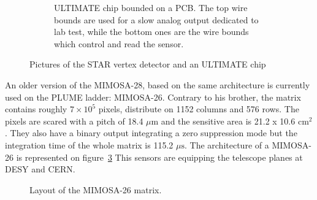 \begin{figure}[!h]
\begin{subfigure}[t]{0.3\textwidth}
        \caption{ULTIMATE chip bounded on a PCB. The top wire bounds are used for a slow analog output dedicated to lab test, while the bottom ones are the wire bounds which control and read the sensor. }
        \label{fig:ultimate}
    \end{subfigure}
    \caption{Pictures of the STAR vertex detector and an ULTIMATE chip}\label{fig:Mi28}
    \end{figure}    

An older version of the \gls{MIMOSA}-28, based on the same architecture is currently used on the \gls{PLUME} ladder: \gls{MIMOSA}-26.
    Contrary to his brother, the matrix contains roughly $7 \times 10^5$ pixels, distribute on 1152 columns and 576 rows.
    The pixels are scared with a pitch of 18.4 $\mu\text{m}$ and the sensitive area is 21.2 x 10.6 $\text{cm}^2$.
    They also have a binary output integrating a zero suppression mode but the integration time of the whole matrix is 115.2 $\mu\text{s}$.
    The architecture of a \gls{MIMOSA}-26 is represented on figure~\ref{fig:archMi26}
    This sensors are equipping the telescope planes at DESY and CERN.

    \begin{figure}[!h]
      \label{fig:archMi26}
      \caption{Layout of the MIMOSA-26 matrix.}
    \end{figure}
    


